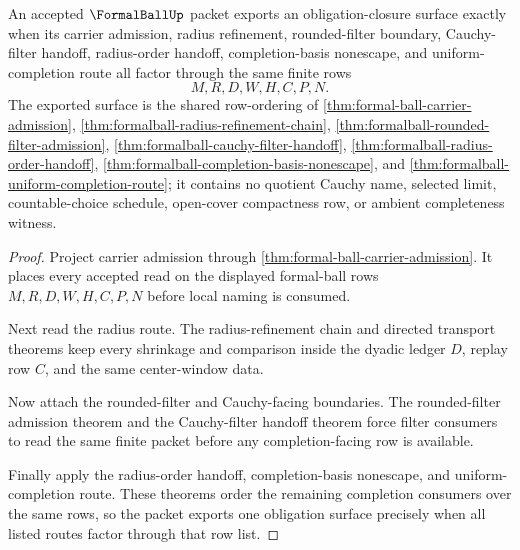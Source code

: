 \begin{theorem}
\label{thm:formalball-obligation-closure-export}
An accepted $\FormalBallUp$ packet exports an obligation-closure surface exactly when its carrier admission, radius refinement, rounded-filter boundary, Cauchy-filter handoff, radius-order handoff, completion-basis nonescape, and uniform-completion route all factor through the same finite rows
$$
M,R,D,W,H,C,P,N .
$$
The exported surface is the shared row-ordering of \autoref{thm:formal-ball-carrier-admission}, \autoref{thm:formalball-radius-refinement-chain}, \autoref{thm:formalball-rounded-filter-admission}, \autoref{thm:formalball-cauchy-filter-handoff}, \autoref{thm:formalball-radius-order-handoff}, \autoref{thm:formalball-completion-basis-nonescape}, and \autoref{thm:formalball-uniform-completion-route}; it contains no quotient Cauchy name, selected limit, countable-choice schedule, open-cover compactness row, or ambient completeness witness.
\end{theorem}
\begin{proof}
Project carrier admission through \autoref{thm:formal-ball-carrier-admission}. It places every accepted read on the displayed formal-ball rows $M,R,D,W,H,C,P,N$ before local naming is consumed.

Next read the radius route. The radius-refinement chain and directed transport theorems keep every shrinkage and comparison inside the dyadic ledger $D$, replay row $C$, and the same center-window data.

Now attach the rounded-filter and Cauchy-facing boundaries. The rounded-filter admission theorem and the Cauchy-filter handoff theorem force filter consumers to read the same finite packet before any completion-facing row is available.

Finally apply the radius-order handoff, completion-basis nonescape, and uniform-completion route. These theorems order the remaining completion consumers over the same rows, so the packet exports one obligation surface precisely when all listed routes factor through that row list.
\end{proof}

